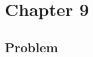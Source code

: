 \documentclass[12pt]{extarticle}
\theoremstyle{definition}
\begin{document}
\section{Chapter 9}

\subsection{Problem }
\end{document}
